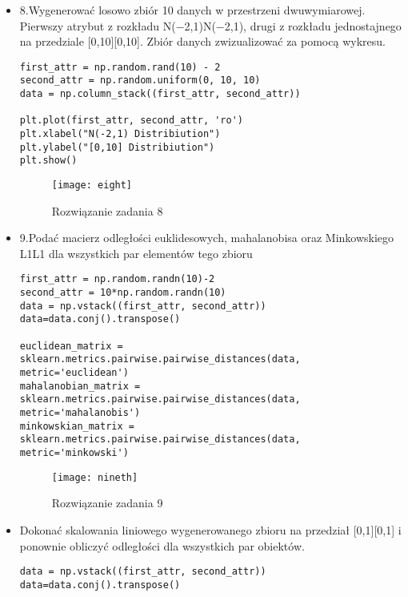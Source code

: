 \documentclass[12pt,a4paper]{article}
\begin{document}
\begin{itemize}
                                       \item 8.Wygenerować losowo zbiór 10 danych w przestrzeni dwuwymiarowej. Pierwszy atrybut z rozkładu N(−2,1)N(−2,1), drugi z rozkładu jednostajnego na przedziale [0,10][0,10]. Zbiór danych zwizualizować za pomocą wykresu.
	\begin{lstlisting}
first_attr = np.random.rand(10) - 2
second_attr = np.random.uniform(0, 10, 10)
data = np.column_stack((first_attr, second_attr))

plt.plot(first_attr, second_attr, 'ro')
plt.xlabel("N(-2,1) Distribiution")
plt.ylabel("[0,10] Distribiution")
plt.show()

	\end{lstlisting}
		\begin{figure}[h]
                        \texttt{[image: eight]}
                        \centering
			\caption{Rozwiązanie zadania 8}
			\label{fig:fig8}
                \end{figure}
                \clearpage
                                       \item 9.Podać macierz odległości euklidesowych, mahalanobisa oraz Minkowskiego L1L1 dla wszystkich par elementów tego zbioru
	\begin{lstlisting}
first_attr = np.random.randn(10)-2
second_attr = 10*np.random.randn(10)
data = np.vstack((first_attr, second_attr))
data=data.conj().transpose()

euclidean_matrix = sklearn.metrics.pairwise.pairwise_distances(data, metric='euclidean')
mahalanobian_matrix = sklearn.metrics.pairwise.pairwise_distances(data,  metric='mahalanobis')
minkowskian_matrix = sklearn.metrics.pairwise.pairwise_distances(data, metric='minkowski')

	\end{lstlisting}
		\begin{figure}[h]
                        \texttt{[image: nineth]}
                        \centering
			\caption{Rozwiązanie zadania 9}
			\label{fig:fig9}
                \end{figure}
                \clearpage
                                       \item Dokonać skalowania liniowego wygenerowanego zbioru na przedział [0,1][0,1] i ponownie obliczyć odległości dla wszystkich par obiektów.
	\begin{lstlisting}
data = np.vstack((first_attr, second_attr))
data=data.conj().transpose()


\end{lstlisting}
\end{itemize}
\end{document}
